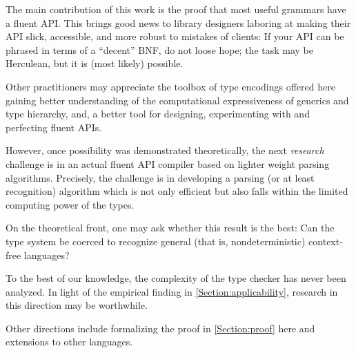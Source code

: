 The main contribution of this work is the proof that 
  most useful grammars have a fluent API.
This brings good news to library designers laboring
  at making their API slick, accessible, and more
  robust to mistakes of clients: 
If your API can be phrased in terms of a ``decent''
  BNF, do not loose hope; the task may be Herculean, but it is (most likely) possible. 

Other practitioners may appreciate the toolbox of type encodings offered here 
  gaining better understanding of the computational expressiveness of
  \Java generics and type hierarchy, and, a better tool
  for designing, experimenting with and perfecting fluent APIs.

However, once possibility was demonstrated theoretically, the next \emph{research} 
    challenge is in an actual fluent API compiler based on lighter weight
  parsing algorithms.
Precisely, the challenge 
  is in developing a parsing (or at least recognition) 
  algorithm which is not only efficient but also falls within the limited computing power of the \Java types. 

On the theoretical front, one may ask whether 
  this result is the best:
Can the \Java type system be coerced to recognize
  general (that is, nondeterministic) context-free languages?

To the best of our knowledge, 
  the complexity of the \Java type checker has never been analyzed. 
In light of the empirical finding in \cref{Section:applicability},
  research in this direction may be worthwhile. 

Other directions include 
  formalizing the proof in \cref{Section:proof} here and 
  extensions to other languages.
